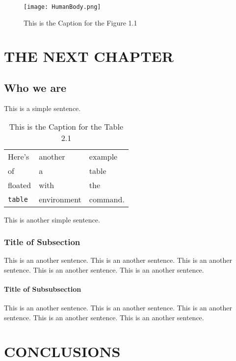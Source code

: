 \documentclass[a4paper, 12pt]{report}
\begin{document}
\begin{figure}[!h]
\begin{center}
\texttt{[image: HumanBody.png]}
\caption{This is the Caption for the Figure 1.1}
\end{center}
\end{figure}

\chapter{THE NEXT CHAPTER}
\section{Who we are}

This is a simple sentence.
\begin{table}[h]
\begin{center}
\begin{tabular}{lll}
Here's       & another     & example  \\
of           & a           & table    \\
floated      & with        & the      \\
\verb+table+ & environment & command.
\end{tabular}
\end{center}
\caption{This is the Caption for the Table 2.1}
\end{table}

This is another simple sentence.

\subsection{Title of Subsection}

This is an another sentence. This is an another sentence. This is an another sentence. This is an another sentence. 
This is an another sentence.

\subsubsection{Title of Subsubsection}

This is an another sentence. This is an another sentence. This is an another sentence. This is an another sentence. 
This is an another sentence.

\chapter{CONCLUSIONS}
\end{document}
